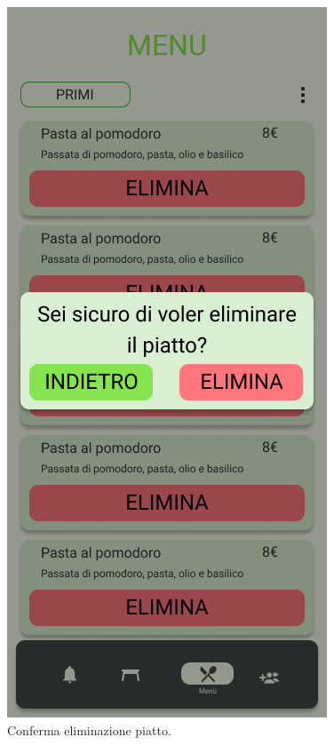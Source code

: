 \begin{figure}[H]
  \centering
  \includegraphics[scale=0.6]{img/mock-up/Confirm_dish_deletion.png}
  \caption{Conferma eliminazione piatto.}
\end{figure}
\newpage

